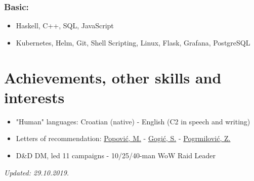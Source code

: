 \documentclass[a4paper]{article}
\newcommand{\bolditalicpair}
[2]
{\textbf{#1} \texorpdfstring{\hfill}{} \textit{#2}}
\begin{document}
\subsubsection{\bolditalicpair{Basic:}{}}

\begin{itemize}
  \item Haskell, C++, SQL, JavaScript
  \item Kubernetes, Helm, Git, Shell Scripting, Linux, Flask, Grafana, PostgreSQL
\end{itemize}



\section{Achievements, other skills and interests}

\begin{itemize}
  \item "Human" languages: Croatian (native) - English (C2 in speech and writing)
  \item Letters of recommendation: \href{https://github.com/MislavJaksic/CV/blob/master/LoR/AISoft_Popovic.pdf}{Popović, M.} - \href{https://github.com/MislavJaksic/CV/blob/master/LoR/Atos_Gogic.pdf}{Gogić, S.} - \href{https://github.com/MislavJaksic/CV/blob/master/LoR/Atos_Pogrmilovic.pdf}{Pogrmilović, Z.}
  \item D\&D DM, led 11 campaigns - 10/25/40-man WoW Raid Leader
\end{itemize}

\bolditalicpair{}{Updated: 29.10.2019.}
\end{document}
